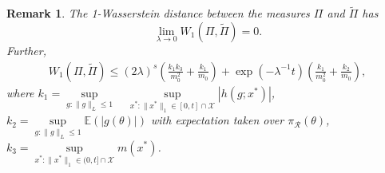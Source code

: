 \documentclass[10pt,fleqn]{article}
\newtheorem{remark}{Remark}
\newcommand{\mc}[1]{\mathcal{#1}}
\DeclareMathOperator{\1}{\mathbbm{1}}
\begin{document}
  
\begin{remark}
The 1-Wasserstein distance between the measures $\Pi$ and $\tilde \Pi$ has
$$ \underset{\lambda \to 0}\lim W_1(\Pi,\tilde\Pi)=0.$$
Further,
\begin{equation}
\begin{aligned}
W_1(\Pi,\tilde\Pi) \le  (2\lambda)^{s} (\frac{k_1 k_3}{m_0^2} + \frac{k_1}{m_0}) + \exp(- \lambda^{-1} t )(\frac{k_1}{m_0^2} + \frac{k_2}{m_0}),
\end{aligned}
\end{equation}
where $k_1= \underset{g:\|g\|_L\le 1}\sup \quad \underset{x^{*}:\|x^{*}\|_1\in[0,t]\cap
\mathcal X}\sup |h(g; x^*)|$, $k_2=\underset{g:\|g\|_L\le 1} \sup \mathbb{E}(| g(\theta )| )$ with expectation taken over $\pi_{\mc R}(\theta)$, $k_3= \underset{x^{*}:\|x^{*}\|_1\in(0,t]\cap
\mathcal X}\sup m(x^{*})$.
\end{remark}
\end{document}
